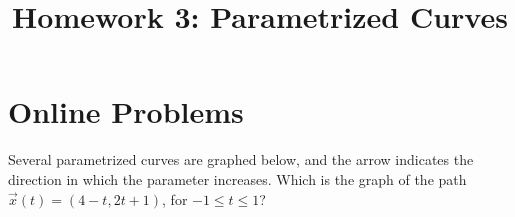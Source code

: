 \documentclass{ximera}
\title{Homework 3: Parametrized Curves}
\begin{document}
\begin{abstract}
\end{abstract}
\maketitle
\section*{Online Problems}

\begin{problem}
Several parametrized curves are graphed below, and the arrow indicates the direction in which the parameter increases. Which is the graph of the path $\vec{x}(t) = (4-t, 2t+1)$, for $-1\leq t\leq 1$?
\begin{multipleChoice}

\end{multipleChoice}
\end{problem}
\end{document}
